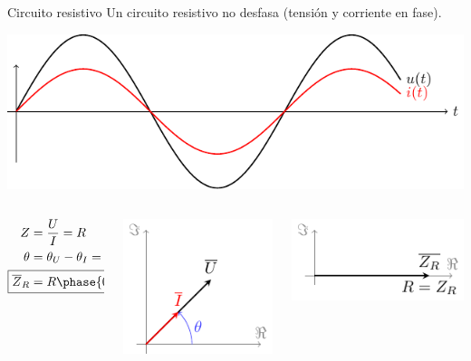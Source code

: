 \documentclass[aspectratio=169, xcolor={usenames,svgnames,dvipsnames}]{beamer}
\begin{document}
\begin{frame}{Circuito resistivo}
Un circuito resistivo no desfasa (\alert{tensión y corriente en fase}).
\begin{center}
\includegraphics[height=0.3\textheight]{../figs/resistivo.pdf}
\end{center}

\begin{columns}
\begin{column}{0.3\columnwidth}
\begin{align*}
  Z &= \frac{U}{I} = R\\
  \theta &= \theta_U - \theta_I = 0\\
  \Aboxed{\overline{Z}_R &= R \phase{0}}
\end{align*}
\end{column}

\begin{column}{0.35\columnwidth}
\begin{center}
\includegraphics[height=0.35\textheight]{../figs/fasorResistencia_VI.pdf}
\end{center}
\end{column}


\begin{column}{0.35\columnwidth}
\begin{center}
\includegraphics[height=0.25\textheight]{../figs/fasorResistencia.pdf}
\end{center}
\end{column}
\end{columns}
\end{frame}
\end{document}
